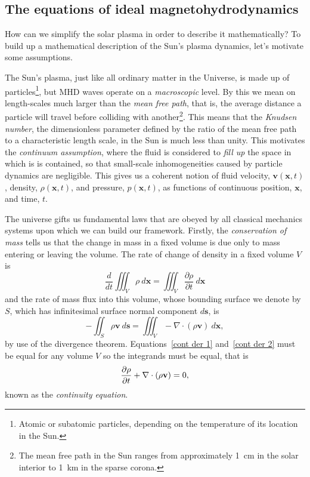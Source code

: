 \subsection{The equations of ideal magnetohydrodynamics} \label{sec: MHD eqns}

How can we simplify the solar plasma in order to describe it mathematically? To build up a mathematical description of the Sun's plasma dynamics, let's motivate some assumptions.

The Sun's plasma, just like all ordinary  matter in the Universe, is made up of particles\footnote{Atomic or subatomic particles, depending on the temperature of its location in the Sun.}, but MHD waves operate on a \textit{macroscopic} level. By this we mean on length-scales much larger than the \textit{mean free path}, that is, the average distance a particle will travel before colliding with another\footnote{The mean free path in the Sun ranges from approximately 1~cm in the solar interior to 1~km in the sparse corona.}. This means that the \textit{Knudsen number}, the dimensionless parameter defined by the ratio of the mean free path to a characteristic length scale, in the Sun is much less than unity. This motivates the \textit{continuum assumption}, where the fluid is considered to \textit{fill up} the space in which is is contained, so that small-scale inhomogeneities caused by particle dynamics are negligible. This gives us a coherent notion of fluid velocity, $\mathbf{v}(\mathbf{x}, t)$, density, $\rho(\mathbf{x}, t)$, and pressure, $p(\mathbf{x}, t)$, as functions of continuous position, $\mathbf{x}$, and time, $t$.

The universe gifts us fundamental laws that are obeyed by all classical mechanics systems upon which we can build our framework. Firstly, the \textit{conservation of mass} tells us that the change in mass in a fixed volume is due only to mass entering or leaving the volume. The rate of change of density in a fixed volume $V$ is
\begin{equation}
	\frac{d}{dt} \iiint_V \rho ~d\mathbf{x} = \iiint_V \frac{\partial\rho}{\partial t} ~d\mathbf{x} \label{cont der 1}
\end{equation}
and the rate of mass flux into this volume, whose bounding surface we denote by $S$, which has infinitesimal surface normal component $d\mathbf{s}$, is
\begin{equation}
	-\iint_S \rho \mathbf{v} ~d\mathbf{s} = \iiint_V -\nabla\cdot(\rho\mathbf{v}) ~d\mathbf{x}, \label{cont der 2}
\end{equation}
by use of the divergence theorem. Equations~\eqref{cont der 1} and~\eqref{cont der 2} must be equal for any volume $V$ so the integrands must be equal, that is
\begin{equation}
	\frac{\partial\rho}{\partial t} + \nabla\cdot(\rho \mathbf{v}) = 0, \label{cont eqn}
\end{equation}
known as the \textit{continuity equation}.

